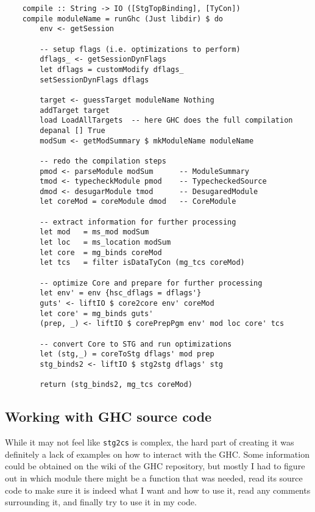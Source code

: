 \documentclass[en]{pracamgr}
\begin{document}
\begin{verbatim}
    compile :: String -> IO ([StgTopBinding], [TyCon])
    compile moduleName = runGhc (Just libdir) $ do
        env <- getSession
        
        -- setup flags (i.e. optimizations to perform)
        dflags_ <- getSessionDynFlags
        let dflags = customModify dflags_
        setSessionDynFlags dflags

        target <- guessTarget moduleName Nothing
        addTarget target
        load LoadAllTargets  -- here GHC does the full compilation
        depanal [] True
        modSum <- getModSummary $ mkModuleName moduleName

        -- redo the compilation steps
        pmod <- parseModule modSum      -- ModuleSummary
        tmod <- typecheckModule pmod    -- TypecheckedSource
        dmod <- desugarModule tmod      -- DesugaredModule
        let coreMod = coreModule dmod   -- CoreModule

        -- extract information for further processing
        let mod   = ms_mod modSum
        let loc   = ms_location modSum
        let core  = mg_binds coreMod
        let tcs   = filter isDataTyCon (mg_tcs coreMod)

        -- optimize Core and prepare for further processing
        let env' = env {hsc_dflags = dflags'}
        guts' <- liftIO $ core2core env' coreMod
        let core' = mg_binds guts' 
        (prep, _) <- liftIO $ corePrepPgm env' mod loc core' tcs

        -- convert Core to STG and run optimizations
        let (stg,_) = coreToStg dflags' mod prep
        stg_binds2 <- liftIO $ stg2stg dflags' stg

        return (stg_binds2, mg_tcs coreMod)
\end{verbatim}

\subsection{Working with GHC source code}
While it may not feel like \texttt{stg2cs} is complex,
the hard part of creating it was definitely a lack of
examples on how to interact with the GHC.
Some information could be obtained on the wiki of the GHC
repository, but mostly I had to figure out in which
module there might be a function that was needed,
read its source code to make sure it is indeed what
I want and how to use it, read any comments surrounding it,
and finally try to use it in my code.
\end{document}
